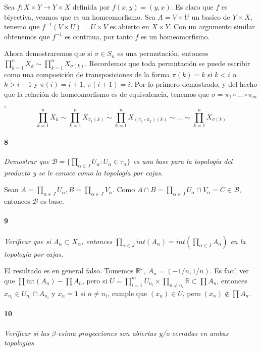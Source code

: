 \documentclass[12pt]{article}
\begin{document}
Sea $f: X \times Y \to Y \times X$ definida por $f(x,y)=(y,x)$. Es claro que $f$ es biyectiva, veamos que es un homeomorfismo. Sea $A=V \times U$ un basico de $Y \times X$, 
tenemo que $f^{-1}(V \times U)=U \times V$ es abierto en $X \times Y$. Con un argumento similar obtenemos que $f^{-1}$ es continua, por tanto $f$ es un homeomorfismo.

Ahora demostraremos que si $\sigma \in S_n$ es una permutación, entonces $\prod_{k=1}^{n} X_k \sim \prod_{k=1}^{n} X_{\sigma(k)}$.
Recordemos que toda permutación se puede escribir como una composición de transposiciones de la forma $\pi(k)=k$ si $k<i$ o $k>i+1$ y $\pi(i)=i+1$, $\pi(i+1)=i$. Por lo primero demostrado,
y del hecho que la relación de homeomorfismo es de equivalencia, tenemos que $\sigma=\pi_1 \circ ...\circ \pi_m$, $$\prod_{k=1}^{n} X_k \sim \prod_{k=1}^{n} X_{\pi_1(k)} \sim \prod_{k=1}^{n} X_{(\pi_1 \circ \pi_2)(k)} \sim ... \sim \prod_{k=1}^{n} X_{\sigma(k)}$$

\paragraph{8}
\textit{Demostrar que $\mathcal{B} = \{\prod\limits_{\alpha\in J}U_\alpha : U_\alpha\in\tau_\alpha\}$ es una base para la topología del producto y se le conoce como la topología por cajas.}

Sean $A=\prod_{\alpha \in J}U_\alpha, B=\prod_{\alpha \in J} V_\alpha$. Como $A \cap B=\prod_{\alpha \in J} U_\alpha \cap V_\alpha = C \in \mathcal{B}$, entonces $\mathcal{B}$ es base.

\paragraph{9}
\textit{Verificar que si $A_{\alpha}\subset X_{\alpha}$, entonces $\prod\limits_{\alpha\in J } int(A_{\alpha}) = int(\prod\limits_{\alpha\in J }A_{\alpha})$ en la topologia por cajas.}

El resultado es en general falso. Tomemos $\mathbb{R}^\omega$, $A_n=\left(-1/n,1/n\right)$. Es facil ver que $\prod \text{int}(A_n)-\prod A_n$, pero si $U=\prod_{i=1}^{m} U_{n_i} \times \prod_{n\neq n_i} \mathbb{R} \subset \prod A_n$,
entonces $x_{n_i} \in U_{n_i} \cap A_{n_i}$ y $x_n=1$ si $n \neq n_i$, cumple que $(x_n) \in U$, pero $(x_n) \notin \prod A_n$.
\paragraph{10}
\textit{Verificar si las $\beta$-esima proyecciones son abiertas y/o cerradas en ambas topologias}
\end{document}
